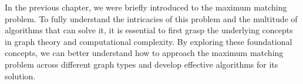 In the previous chapter, we were briefly introduced to the maximum matching problem. To fully understand the intricacies of this problem and the multitude of algorithms that can solve it, it is essential to first grasp the underlying concepts in graph theory and computational complexity. By exploring these foundational concepts, we can better understand how to approach the maximum matching problem across different graph types and develop effective algorithms for its solution.